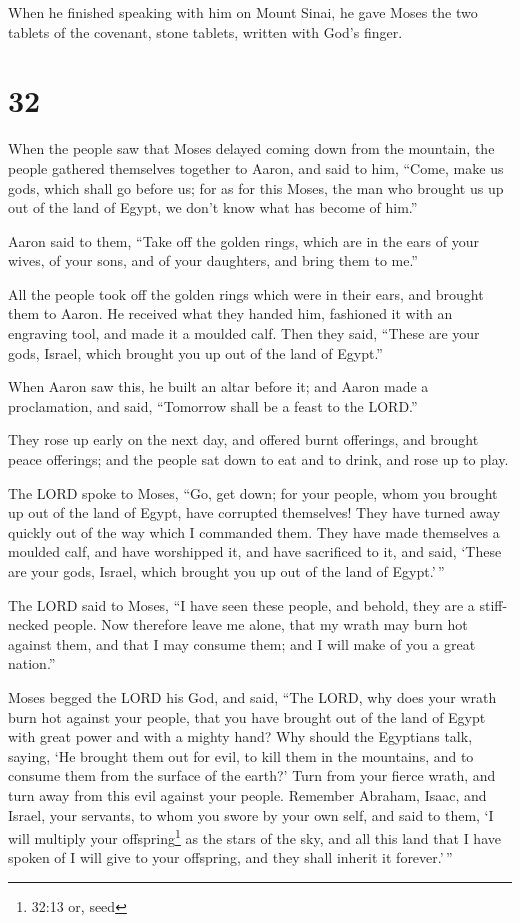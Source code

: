  When he finished speaking with him on Mount Sinai, he gave
Moses the two tablets of the covenant, stone tablets, written with God's
finger.

\hypertarget{section-31}{%
\section{32}\label{section-31}}

 When the people saw that Moses delayed coming down from the
mountain, the people gathered themselves together to Aaron, and said to
him, ``Come, make us gods, which shall go before us; for as for this
Moses, the man who brought us up out of the land of Egypt, we don't know
what has become of him.''

 Aaron said to them, ``Take off the golden rings, which are
in the ears of your wives, of your sons, and of your daughters, and
bring them to me.''

 All the people took off the golden rings which were in
their ears, and brought them to Aaron.  He received what
they handed him, fashioned it with an engraving tool, and made it a
moulded calf. Then they said, ``These are your gods, Israel, which
brought you up out of the land of Egypt.''

 When Aaron saw this, he built an altar before it; and Aaron
made a proclamation, and said, ``Tomorrow shall be a feast to the
LORD.''

 They rose up early on the next day, and offered burnt
offerings, and brought peace offerings; and the people sat down to eat
and to drink, and rose up to play.

 The LORD spoke to Moses, ``Go, get down; for your people,
whom you brought up out of the land of Egypt, have corrupted themselves!
 They have turned away quickly out of the way which I
commanded them. They have made themselves a moulded calf, and have
worshipped it, and have sacrificed to it, and said, `These are your
gods, Israel, which brought you up out of the land of Egypt.'\,''

 The LORD said to Moses, ``I have seen these people, and
behold, they are a stiff-necked people.  Now therefore
leave me alone, that my wrath may burn hot against them, and that I may
consume them; and I will make of you a great nation.''

 Moses begged the LORD his God, and said, ``The LORD, why
does your wrath burn hot against your people, that you have brought out
of the land of Egypt with great power and with a mighty hand?
 Why should the Egyptians talk, saying, `He brought them
out for evil, to kill them in the mountains, and to consume them from
the surface of the earth?' Turn from your fierce wrath, and turn away
from this evil against your people.  Remember Abraham,
Isaac, and Israel, your servants, to whom you swore by your own self,
and said to them, `I will multiply your offspring\footnote{32:13 or,
  seed} as the stars of the sky, and all this land that I have spoken of
I will give to your offspring, and they shall inherit it forever.'\,''

